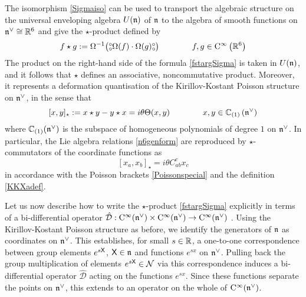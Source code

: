 The isomorphism \eqref{Sigmaiso} can be used to transport the algebraic
structure on the universal enveloping algebra $U({\mathfrak n})$ of ${\mathfrak n}$ to the algebra
of smooth functions on ${\mathfrak n}^\vee\cong{\mathbb R}^6$ and give the $\star$-product defined
by
\begin{equation}
  \label{fstargSigma}
  f\star g:=\Omega^{-1}\bigl( \mbox{$\substack{\circ\\\circ}$} \Omega(f)\cdot\Omega(g) \mbox{$\substack{\circ\\\circ}$}
  \bigr) \qquad\qquad f,g\in{\rm C}^\infty\left({\mathbb R}^6\right)
\end{equation}
The product on the right-hand side of the formula \eqref{fstargSigma} is taken
in $U({\mathfrak n})$, and it follows that $\star$ defines an associative, noncommutative
product. Moreover, it represents a deformation quantisation of the
Kirillov-Kostant Poisson structure on ${\mathfrak n}^\vee$, in the sense that
\begin{equation}
  \label{xyPoisson}
  [x,y]_\star:=x\star y-y\star x= i
  \theta \Theta(x,y) \qquad\qquad x,y\in{\mathbb C}_{(1)}\left({\mathfrak n}^\vee\right)
\end{equation}
where ${\mathbb C}_{(1)}({\mathfrak n}^\vee)$ is the subspace of homogeneous polynomials of
degree $1$ on ${\mathfrak n}^\vee$. In particular, the Lie algebra relations
\eqref{n6genform} are reproduced by $\star$-commutators of the coordinate
functions as
\begin{equation}
  \label{xaxbstarcomm}
  [x_a,x_b]_\star= i\theta C_{ab}^{  c} x_c
\end{equation}
in accordance with the Poisson brackets \eqref{Poissonspecial} and the
definition \eqref{KKXadef}.

Let us now describe how to write the $\star$-product \eqref{fstargSigma}
explicitly in terms of a bi-differential operator $\hat{\mathcal{D}}:
{\rm C}^\infty({\mathfrak n}^\vee)\times{\rm C}^\infty({\mathfrak n}^\vee)\to {\rm C}^\infty({\mathfrak n}^\vee)$
\cite{Kathotia1}. Using the Kirillov-Kostant Poisson structure as before, we
identify the generators of ${\mathfrak n}$ as coordinates on ${\mathfrak n}^\vee$. This
establishes, for small $s\in{\mathbb R}$, a one-to-one correspondence between group
elements $ e^{s {\sf X}}$, ${\sf X}\in{\mathfrak n}$ and functions $ e^{s x}$ on ${\mathfrak n}^\vee$.
Pulling back the group multiplication of elements $ e^{s {\sf X}}\in\mathcal{N}$ via
this correspondence induces a bi-differential operator $\hat{\mathcal{D}}$
acting on the functions $ e^{s x}$. Since these functions separate the points on
${\mathfrak n}^\vee$, this extends to an operator on the whole of
${\rm C}^\infty({\mathfrak n}^\vee)$.

